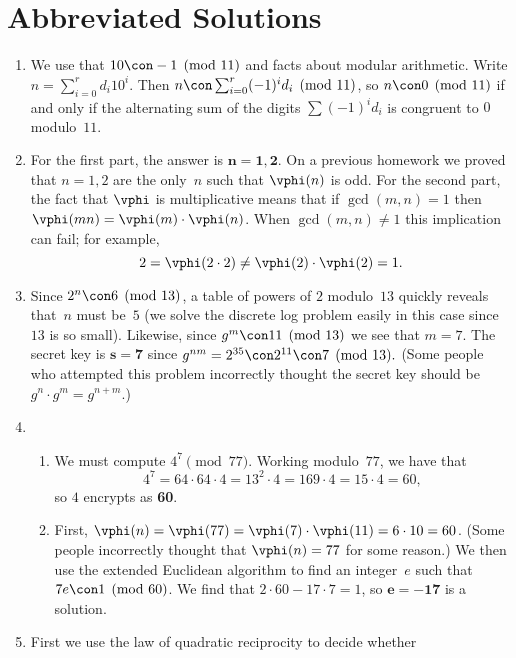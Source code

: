 \documentclass[11pt]{report}
\begin{document}
\section{Abbreviated Solutions}
\begin{enumerate}
  \item We use that $10\con -1\pmod{11}$ and facts about modular arithmetic.
        Write $n = \sum_{i=0}^r d_i 10^i$. Then
        $n \con \sum_{i=0}^r (-1)^i d_i\pmod{11}$, so $n\con 0\pmod{11}$ if and
        only if the alternating sum of the digits $\sum (-1)^i d_i$ is congruent
        to $0$ modulo~$11$.
  \item For the first part, the  answer is $\mathbf{n=1,2}$.  On a
        previous homework we proved that $n=1,2$ are the only~$n$ such that
        $\vphi(n)$ is odd.  For the second part, the fact that $\vphi$ is
        multiplicative means that if $\gcd(m,n)=1$ then
        $\vphi(mn)=\vphi(m)\cdot\vphi(n)$.  When $\gcd(m,n)\neq 1$ this implication
        can fail; for example,
        $$
          2 = \vphi(2\cdot 2)\neq \vphi(2)\cdot
          \vphi(2)=1.
        $$
  \item Since $2^n\con 6\pmod{13}$, a table of powers of $2$ modulo~$13$
        quickly reveals that~$n$ must be~$5$ (we solve the discrete log problem
        easily in this case since $13$ is so small).  Likewise, since
        $g^m\con 11\pmod{13}$ we see that $m=7$.  The secret key is $\mathbf{s=7}$
        since $g^{nm}=2^{35} \con 2^{11} \con 7\pmod{13}.$
        (Some people who attempted this problem incorrectly thought the secret key
        should be $g^n\cdot g^m = g^{n+m}$.)
  \item
        \begin{enumerate}
          \item We must compute $4^7\pmod{77}$.  Working modulo~$77$, we have that
                $$4^7 = 64\cdot 64 \cdot 4 = 13^2\cdot 4 = 169\cdot 4 = 15\cdot 4 = 60,$$
                so $4$ encrypts as {\bf 60}.
          \item
                First, $\vphi(n) = \vphi(77)=\vphi(7)\cdot\vphi(11)=6\cdot 10=60$.
                (Some people incorrectly thought that $\vphi(n)=77$ for some reason.)
                We then use the extended Euclidean algorithm to
                find an integer~$e$ such that $7e\con 1\pmod{60}$. We find that
                $2\cdot 60 -17\cdot 7=1$, so $\mathbf{e=-17}$ is a solution.
        \end{enumerate}
  \item First we use the law of quadratic reciprocity to decide whether

\end{enumerate}
\end{document}

